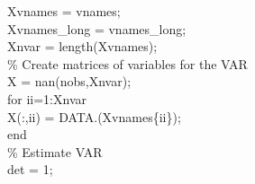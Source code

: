 \hspace{1mm}\hspace{5mm} \hspace{5mm} Xvnames      = vnames; \\ 
\hspace{1mm}\hspace{5mm} \hspace{5mm} Xvnames\_long = vnames\_long; \\ 
\hspace{1mm}\hspace{5mm} \hspace{5mm} Xnvar        = length(Xvnames); \\ 
\hspace{1mm}\hspace{5mm} \hspace{5mm} \textcolor{matlabgreen}{\% Create matrices of variables \textcolor{matlabblue}{for} the VAR }\\ 
\hspace{1mm}\hspace{5mm} \hspace{5mm} \hspace{5mm} X = nan(nobs,Xnvar); \\ 
\hspace{1mm}\hspace{5mm} \hspace{5mm} \hspace{5mm} \textcolor{matlabblue}{for} ii=1:Xnvar \\ 
\hspace{1mm}\hspace{5mm} \hspace{5mm} \hspace{5mm} \hspace{5mm} X(:,ii) = DATA.(Xvnames\{ii\}); \\ 
\hspace{1mm}\hspace{5mm} \hspace{5mm} \hspace{5mm} \textcolor{matlabblue}{end} \\ 
\hspace{1mm}\hspace{5mm} \hspace{5mm} \hspace{5mm} \textcolor{matlabgreen}{\% Estimate VAR  }\\ 
\hspace{1mm}\hspace{5mm} \hspace{5mm} \hspace{5mm} det = 1; \\ 
